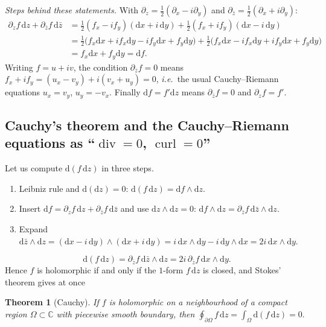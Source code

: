 \documentclass[11pt,a4paper]{article}
\newcounter{thm}[section]
\numberwithin{equation}{section}
\theoremstyle{definition}
\theoremstyle{plain}
\newtheorem{theorem}[thm]{Theorem}
\newcommand{\C}{\mathbb{C}}
\newcommand{\dd}{\mathrm{d}}
\newcommand{\ie}{\emph{i.e.}\ }
\begin{document}
\emph{Steps behind these statements.} With $\partial_z=\frac12(\partial_x-i\partial_y)$ and $\partial_{\bar z}=\frac12(\partial_x+i\partial_y)$:
\begin{align*}
\partial_zf\,\dd z+\partial_{\bar z}f\,\dd\bar z&=\tfrac12(f_x-if_y)(\dd x+i\,\dd y)+\tfrac12(f_x+if_y)(\dd x-i\,\dd y)\\
&=\tfrac12\bigl(f_x\dd x+if_x\dd y-if_y\dd x+f_y\dd y\bigr)+\tfrac12\bigl(f_x\dd x-if_x\dd y+if_y\dd x+f_y\dd y\bigr)\\
&=f_x\dd x+f_y\dd y=\dd f.
\end{align*}
Writing $f=u+iv$, the condition $\partial_{\bar z}f=0$ means $f_x+if_y=(u_x-v_y)+i(v_x+u_y)=0$, \ie the usual Cauchy--Riemann equations $u_x=v_y$, $u_y=-v_x$. Finally $\dd f=f'\dd z$ means $\partial_{\bar z}f=0$ and $\partial_zf=f'$.

\subsection{Cauchy's theorem and the Cauchy--Riemann equations as ``$\operatorname{div}=0$, $\operatorname{curl}=0$''}\label{sec:cauchy}

Let us compute $\dd(f\,\dd z)$ in three steps.
\begin{enumerate}
\item Leibniz rule and $\dd(\dd z)=0$: $\dd(f\,\dd z)=\dd f\wedge\dd z$.
\item Insert $\dd f=\partial_zf\,\dd z+\partial_{\bar z}f\,\dd\bar z$ and use $\dd z\wedge\dd z=0$: $\dd f\wedge\dd z=\partial_{\bar z}f\,\dd\bar z\wedge\dd z$.
\item Expand $\dd\bar z\wedge\dd z=(\dd x-i\,\dd y)\wedge(\dd x+i\,\dd y)=i\,\dd x\wedge\dd y-i\,\dd y\wedge\dd x=2i\,\dd x\wedge\dd y$.
\end{enumerate}
\begin{equation}\label{eq:dfdz}
\dd(f\,\dd z)=\partial_{\bar z}f\,\dd\bar z\wedge\dd z=2i\,\partial_{\bar z}f\,\dd x\wedge\dd y .
\end{equation}
Hence $f$ is holomorphic if and only if the $1$-form $f\,\dd z$ is closed, and Stokes' theorem gives at once

\begin{theorem}[Cauchy]\label{thm:cauchy}
If $f$ is holomorphic on a neighbourhood of a compact region $\Omega\subset\C$ with piecewise smooth boundary, then
$\displaystyle\oint_{\partial\Omega}f\,\dd z=\int_\Omega\dd(f\,\dd z)=0.$
\end{theorem}
\end{document}

